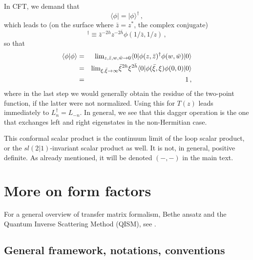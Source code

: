 \documentclass[a4paper,10pt]{article}
\newcommand{\linnea}[1]{$\framebox{\tiny L}$\ \textbf{\texttt{{\color{red}\footnotesize#1}}}}
\newcommand{\jesper}[1]{$\framebox{\tiny J}$\ \textbf{\texttt{{\color{cyan}\footnotesize#1}}}}
\begin{document}
In CFT, we demand that 
%
\begin{equation}
\langle\phi|=|\phi\rangle^\dagger \,,
\end{equation}
%
which leads to (on the surface where $\bar{z}=z^*$, the complex conjugate)
%
\begin{equation}
[\phi(z,\bar{z})]^\dagger\equiv \bar{z}^{-2h}z^{-2\bar{h}}\phi(1/\bar{z},1/z) \,,
\end{equation}
%
so that
%
\begin{eqnarray}
\langle\phi|\phi\rangle &=& \hbox{lim}_{z,\bar{z},w,\bar{w}\to 0}\langle 0|\phi(z,\bar{z})^\dagger\phi(w,\bar{w})|0\rangle\nonumber\\
&=&\hbox{lim}_{\xi,\bar{\xi}\to\infty}\bar{\xi}^{2h}\xi^{2\bar{h}}\langle 0|\phi(\bar{\xi},\xi)\phi(0,0)|0\rangle \nonumber \\
&=&1 \,,
\end{eqnarray}
%
where in the last step we would generally obtain the residue of the two-point function, if the latter were not normalized. Using this for $T(z)$ leads immediately to $L_n^\dagger=L_{-n}$. In general, we see that this dagger operation is the one that exchanges left and right eigenstates in the non-Hermitian case. 

This conformal scalar product is the continuum limit of the loop scalar product, or the $sl(2|1)$-invariant scalar product as well. It is not, in general, positive definite. 
As already mentioned, it will be denoted $(-,-)$ in the main text.

\section{More on form factors}\label{FormFactorAppendix}


For a general overview of transfer matrix formalism, Bethe ansatz and the Quantum Inverse Scattering Method (QISM), see \cite{Slavnov}. %


\subsection{General framework, notations, conventions}
\end{document}
